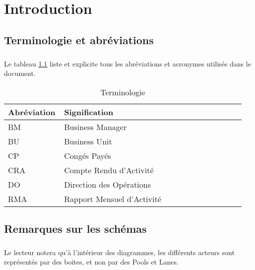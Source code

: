 \documentclass[12pt]{scrreprt}
\author{Direction des opérations}
\date{Avril 2016}
\begin{document}


\tableofcontents
\chapter{Introduction}

\section{Terminologie et abréviations}
\paragraph{} Le tableau \ref{abbr} liste et explicite tous les abréviations et acronymes utilisés dans le document.
\begin{table}[H]
\begin{center}
    \begin{longtable}{|p{0.2\linewidth}|p{0.75\linewidth}|}
    \hline  %
    \rowcolor[gray]{.8}
    Abréviation & Signification\\
    \hline
    BM & Business Manager\\
    \hline
    BU & Business Unit \\
    \hline
    CP & Congés Payés\\
    \hline
    CRA & Compte Rendu d'Activité\\
    \hline
    DO & Direction des Opérations\\
    \hline
    RMA & Rapport Mensuel d'Activité\\
    \hline
    \end{longtable}
    \caption{Terminologie}
    \label{abbr}
\end{center}
\end{table}

\section{Remarques sur les schémas}
\paragraph{} Le lecteur notera qu'à l'intérieur des diagrammes, les différents acteurs sont représentés par des boites, et non par des Pools et Lanes.
\end{document}
